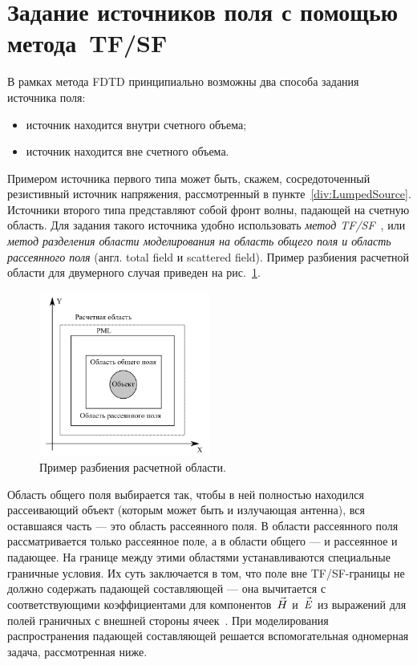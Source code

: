 %
%
%
\section{Задание источников поля с помощью метода~TF/SF}

В рамках метода FDTD принципиально возможны два способа задания источника поля:
\begin{itemize}
\item источник находится внутри счетного объема;
\item источник находится вне счетного объема.
\end{itemize}
Примером источника первого типа может быть, скажем, сосредоточенный резистивный
источник напряжения, рассмотренный в пункте~\ref{div:LumpedSource}. Источники
второго типа представляют собой фронт волны, падающей на счетную область. Для
задания такого источника удобно использовать
\emph{метод TF/SF}~\cite{bib:Taflove1995,bib:Davidson2005,bib:Berenger1994,
bib:Berenger1996}, или \emph{метод разделения области моделирования на область
общего поля и область рассеянного поля} (англ. total field и scattered field).
Пример разбиения расчетной области для двумерного случая приведен на
рис.~\ref{fig:Tfsf:SubdivisionExample}.

\begin{figure}[p]
\centering
\includegraphics[width=0.5\textwidth]{graphics/tfsf-subdivision-example}
\caption{Пример разбиения расчетной области.}
\label{fig:Tfsf:SubdivisionExample}
\end{figure}

Область общего поля выбирается так, чтобы в ней полностью находился рассеивающий
объект (которым может быть и излучающая антенна), вся оставшаяся часть --- это
область рассеянного поля. В области рассеянного поля рассматривается только
рассеянное поле, а в области общего --- и рассеянное и падающее. На границе
между этими областями устанавливаются специальные граничные условия. Их суть
заключается в том, что поле вне TF/SF-границы не должно содержать падающей
составляющей --- она вычитается с соответствующими коэффициентами для
компонентов~$\vec{H\mathstrut}$ и~$\vec{E\mathstrut}$ из выражений для полей граничных с внешней
стороны ячеек~\cite{bib:Bogolyubov2006}. При моделирования распространения
падающей составляющей решается вспомогательная одномерная задача, рассмотренная
ниже.

